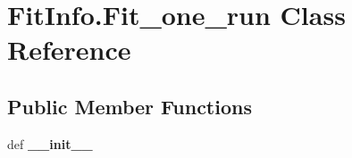 \hypertarget{classFitInfo_1_1Fit__one__run}{\section{\-Fit\-Info.\-Fit\-\_\-one\-\_\-run \-Class \-Reference}
\label{classFitInfo_1_1Fit__one__run}
}
\subsection*{\-Public \-Member \-Functions}
\begin{DoxyCompactItemize}
\item 
\hypertarget{classFitInfo_1_1Fit__one__run_afaeeadb5a8eb0b8e3027bbd6f4aecec4}{def {\bfseries \-\_\-\-\_\-init\-\_\-\-\_\-}}\label{classFitInfo_1_1Fit__one__run_afaeeadb5a8eb0b8e3027bbd6f4aecec4}


\end{DoxyCompactItemize}
